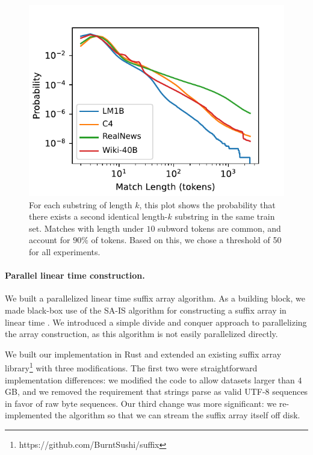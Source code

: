 \begin{figure}
    \centering
    \includegraphics[scale=.8]{figures/match_length.pdf}
    \caption{For each substring of length $k$,
    this plot shows the probability that there exists a second identical length-$k$ substring in the same train set.
    Matches with length under $10$ subword tokens are common, and account for $90\%$ of tokens.
    Based on this, we chose a threshold of 50 for all experiments.
    }
    \label{fig:suffix-match-len}
\end{figure}


\paragraph{Parallel linear time construction.}
We built a parallelized linear time suffix array algorithm.
%
As a building block, we made black-box use of the SA-IS algorithm for
constructing a suffix array in linear time \citet{nong2009linear,ko2003space}.
%
We introduced a simple divide and conquer approach to parallelizing the array construction, as this algorithm is not easily parallelized directly.


We built our implementation in Rust and extended an existing suffix array library\footnote{https://github.com/BurntSushi/suffix}
with three modifications.
The first two were straightforward implementation differences:
we modified the code to allow datasets larger than $4$GB,
and we removed the requirement that strings parse as valid UTF-8 sequences in favor of raw byte sequences.
Our third change was more significant: we re-implemented the algorithm
so that we can stream the suffix array itself off disk.

